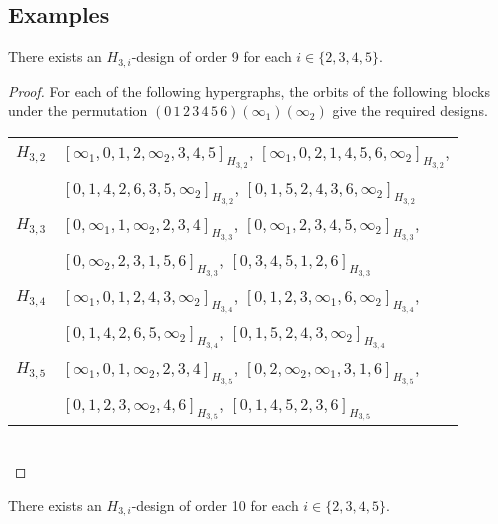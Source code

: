 \begin{subappendices}

\section{Examples} \label{section:examples}


\begin{example} \label{eg:H_3i-9}
There exists an $H_{3,i}$-design of order 9 for each $i \in \{2,3,4,5\}$.
\end{example}

\begin{proof}
For each of the following hypergraphs, the orbits of the following blocks under
the permutation $(0 \, 1 \, 2 \, 3 \, 4 \, 5 \, 6)(\infty_1)(\infty_2)$ give the required designs.

\begin{tabular}{|c|l|}
\hline
$H_{3,2}$ &
  $[\infty_1, 0, 1, 2, \infty_2, 3, 4, 5]_{H_{3,2}}$,
  $[\infty_1, 0, 2, 1, 4, 5, 6, \infty_2]_{H_{3,2}}$, \\ &
  $[0, 1, 4, 2, 6, 3, 5, \infty_2]_{H_{3,2}}$,
  $[0, 1, 5, 2, 4, 3, 6, \infty_2]_{H_{3,2}}$
\\ \hline
$H_{3,3}$ &
  $[0, \infty_1, 1, \infty_2, 2, 3, 4]_{H_{3,3}}$,
  $[0, \infty_1, 2, 3, 4, 5, \infty_2]_{H_{3,3}}$, \\ &
  $[0, \infty_2, 2, 3, 1, 5, 6]_{H_{3,3}}$,
  $[0, 3, 4, 5, 1, 2, 6]_{H_{3,3}}$
\\ \hline
$H_{3,4}$ &
  $[\infty_1, 0, 1, 2, 4, 3, \infty_2]_{H_{3,4}}$,
  $[0, 1, 2, 3, \infty_1, 6, \infty_2]_{H_{3,4}}$, \\ &
  $[0, 1, 4, 2, 6, 5, \infty_2]_{H_{3,4}}$,
  $[0, 1, 5, 2, 4, 3, \infty_2]_{H_{3,4}}$
\\ \hline
$H_{3,5}$ &
  $[\infty_1, 0, 1, \infty_2, 2, 3, 4]_{H_{3,5}}$,
  $[0, 2, \infty_2, \infty_1, 3, 1, 6]_{H_{3,5}}$, \\ &
  $[0, 1, 2, 3, \infty_2, 4, 6]_{H_{3,5}}$,
  $[0, 1, 4, 5, 2, 3, 6]_{H_{3,5}}$
\\ \hline
\end{tabular}
\\
\end{proof}


\begin{example} \label{eg:H_3i-10}
There exists an $H_{3,i}$-design of order 10 for each $i \in \{2,3,4,5\}$.
\end{example}


\end{subappendices}
